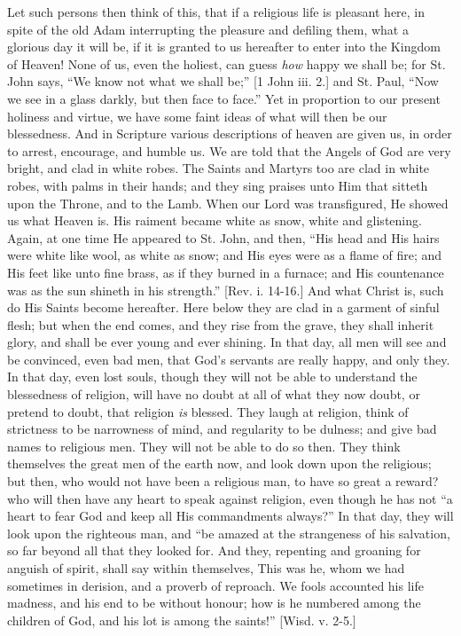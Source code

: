 Let such persons then think of this, that if a
religious life is pleasant here, in spite of the old Adam
interrupting the pleasure and defiling them, what a
glorious day it will be, if it is granted to us hereafter
to enter into the Kingdom of Heaven! None of us, even the
holiest, can guess \emph{how} happy we shall be; for St. John
says, ``We know not what we shall be;'' [1 John
iii. 2.] and St. Paul, ``Now we see in a glass
darkly, but then face to face.'' Yet in proportion to
our present holiness and virtue, we have some faint ideas
of what will then be our blessedness. And in Scripture
various descriptions of heaven are given us, in order to
arrest, encourage, and humble us. We are told that the
Angels of God are very bright, and clad in white robes.
The Saints and Martyrs too are clad in white robes, with
palms in their hands; and they sing praises unto Him that
sitteth upon the Throne, and to the Lamb. When our Lord
was transfigured, He showed us what Heaven is. His
raiment became white as snow, white and glistening.
Again, at one time He appeared to St. John, and then,
``His head and His hairs were white like wool, as
white as snow; and His eyes were as a flame of fire; and
His feet like unto fine brass, as if they burned in a
furnace; and His countenance was as the sun shineth in
his strength.'' [Rev. i. 14-16.] And what Christ is,
such do His Saints become hereafter. Here below they are
clad in a garment of sinful flesh; but when the end
comes, and they rise from the grave, they shall inherit
glory, and shall be ever young and ever shining. In that
day, all men will see and be convinced, even bad men,
that God's servants are really happy, and only they. In
that day, even lost souls, though they will not be able
to understand the blessedness of religion, will have no
doubt at all of what they now doubt, or pretend to doubt,
that religion \emph{is} blessed. They laugh at
religion, think of strictness to be narrowness of mind,
and regularity to be dulness; and give bad names to
religious men. They will not be able to do so then. They
think themselves the great men of the earth now, and look
down upon the religious; but then, who would not have
been a religious man, to have so great a reward? who will
then have any heart to speak against religion, even
though he has not ``a heart to fear God and keep all
His commandments always?'' In that day, they will
look upon the righteous man, and ``be amazed at the
strangeness of his salvation, so far beyond all that they
looked for. And they, repenting and groaning for anguish
of spirit, shall say within themselves, This was he, whom
we had sometimes in derision, and a proverb of reproach.
We fools accounted his life madness, and his end to be
without honour; how is he numbered among the children of
God, and his lot is among the saints!'' [Wisd. v.
2-5.]

